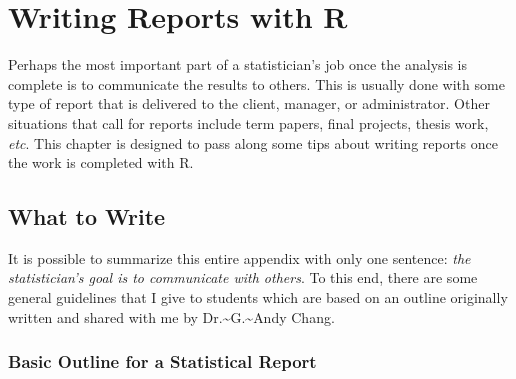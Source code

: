 \documentclass[captions=tableheading]{scrbook}
\begin{document}
\chapter{Writing Reports with \textsf{R}}
\label{sec-7}

\label{cha:Writing-Reports-with}

Perhaps the most important part of a statistician's job once the analysis is complete is to communicate the results to others. This is usually done with some type of report that is delivered to the client, manager, or administrator. Other situations that call for reports include term papers, final projects, thesis work, \emph{etc}. This chapter is designed to pass along some tips about writing reports once the work is completed with \textsf{R}.
\section{What to Write \label{sec:What-to-Write}}
\label{sec-7-1}

It is possible to summarize this entire appendix with only one sentence: \emph{the statistician's goal is to communicate with others}. To this end, there are some general guidelines that I give to students which are based on an outline originally written and shared with me by Dr.\~{}G.\~{}Andy Chang.
\subsection{Basic Outline for a Statistical Report}
\label{sec-7-1-1}
\end{document}
